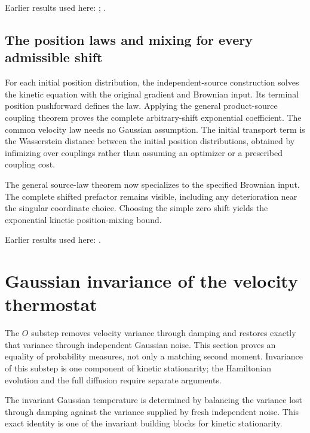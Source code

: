 \documentclass[11pt,a4paper]{report}
\begin{document}
Earlier results used here: \cite[Section~3.8.16]{LangevinLean2026ULASC}; \cite[Section~3.8.17]{LangevinLean2026ULASC}.
\subsection{\texorpdfstring{The position laws and mixing for every admissible shift}{The position laws and mixing for every admissible shift}}
\label{report-step-KineticLangevin-CanonicalContinuousMixing-lean-2}


For each initial position distribution, the independent-source construction solves the kinetic equation with the original gradient and Brownian input. Its terminal position pushforward defines the law. Applying the general product-source coupling theorem proves the complete arbitrary-shift exponential coefficient. The common velocity law needs no Gaussian assumption. The initial transport term is the Wasserstein distance between the initial position distributions, obtained by infimizing over couplings rather than assuming an optimizer or a prescribed coupling cost.



The general source-law theorem now specializes to the specified Brownian input. The complete shifted prefactor remains visible, including any deterioration near the singular coordinate choice. Choosing the simple zero shift yields the exponential kinetic position-mixing bound.



Earlier results used here: \cite[Section~3.17.4]{LangevinLean2026ULASC}.
\section{\texorpdfstring{Gaussian invariance of the velocity thermostat}{Gaussian invariance of the velocity thermostat}}
\label{proof-module-KineticLangevin-Thermostat-lean}


The \(O\) substep removes velocity variance through damping and restores exactly that variance through independent Gaussian noise. This section proves an equality of probability measures, not only a matching second moment. Invariance of this substep is one component of kinetic stationarity; the Hamiltonian evolution and the full diffusion require separate arguments.



The invariant Gaussian temperature is determined by balancing the variance lost through damping against the variance supplied by fresh independent noise. This exact identity is one of the invariant building blocks for kinetic stationarity.
\end{document}
